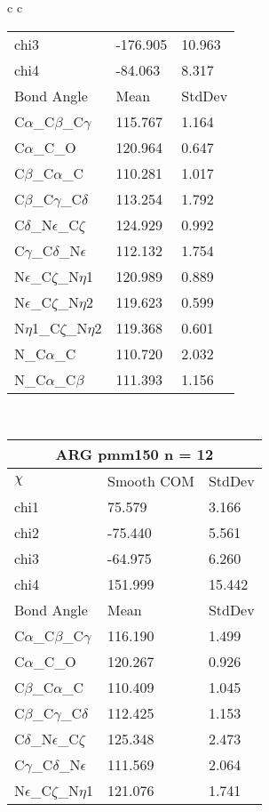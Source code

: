 \begin{longtable}{ c c }
\begin{tabular}{ l l l }
  chi3 & -176.905 & 10.963 \\ 
  chi4 & -84.063 & 8.317 \\ \midrule
  Bond Angle   & Mean     & StdDev \\ \midrule
  C$\alpha$\_C$\beta$\_C$\gamma$ & 115.767 & 1.164\\
  C$\alpha$\_C\_O & 120.964 & 0.647\\
  C$\beta$\_C$\alpha$\_C & 110.281 & 1.017\\
  C$\beta$\_C$\gamma$\_C$\delta$ & 113.254 & 1.792\\
  C$\delta$\_N$\epsilon$\_C$\zeta$ & 124.929 & 0.992\\
  C$\gamma$\_C$\delta$\_N$\epsilon$ & 112.132 & 1.754\\
  N$\epsilon$\_C$\zeta$\_N$\eta$1 & 120.989 & 0.889\\
  N$\epsilon$\_C$\zeta$\_N$\eta$2 & 119.623 & 0.599\\
  N$\eta$1\_C$\zeta$\_N$\eta$2 & 119.368 & 0.601\\
  N\_C$\alpha$\_C & 110.720 & 2.032\\
  N\_C$\alpha$\_C$\beta$ & 111.393 & 1.156\\
  \bottomrule
  \end{tabular}
  \\
  \begin{tabular}{ l l l }
  \toprule
  \multicolumn{3}{c}{ARG \textbf{pmm150} n = 12} \\ \toprule
  $\chi$       & Smooth COM & StdDev \\ \midrule
  chi1 & 75.579 & 3.166 \\ 
  chi2 & -75.440 & 5.561 \\ 
  chi3 & -64.975 & 6.260 \\ 
  chi4 & 151.999 & 15.442 \\ \midrule
  Bond Angle   & Mean     & StdDev \\ \midrule
  C$\alpha$\_C$\beta$\_C$\gamma$ & 116.190 & 1.499\\
  C$\alpha$\_C\_O & 120.267 & 0.926\\
  C$\beta$\_C$\alpha$\_C & 110.409 & 1.045\\
  C$\beta$\_C$\gamma$\_C$\delta$ & 112.425 & 1.153\\
  C$\delta$\_N$\epsilon$\_C$\zeta$ & 125.348 & 2.473\\
  C$\gamma$\_C$\delta$\_N$\epsilon$ & 111.569 & 2.064\\
  N$\epsilon$\_C$\zeta$\_N$\eta$1 & 121.076 & 1.741\\

\end{tabular}
\end{longtable}
